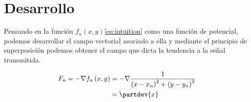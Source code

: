 \documentclass{article}
\begin{document}
\section{Desarrollo}
Pensando en la función $f_n(x,y)$\ref{eq:intuition} como una función de
potencial, podemos desarrollar el campo vectorial asociado a ella y
mediante el principio de superposición podemos obtener el campo que
dicta la tendencia a la señal transmitida.

\begin{align}
  \label{eq:development}
  F_n = -\nabla f_n\left( x, y \right) &= -\nabla \frac{1}{\left( x - x_n \right)^2 + \left( y - y_n \right)^2}\\
  &= \partdev{x}
\end{align}
\end{document}
